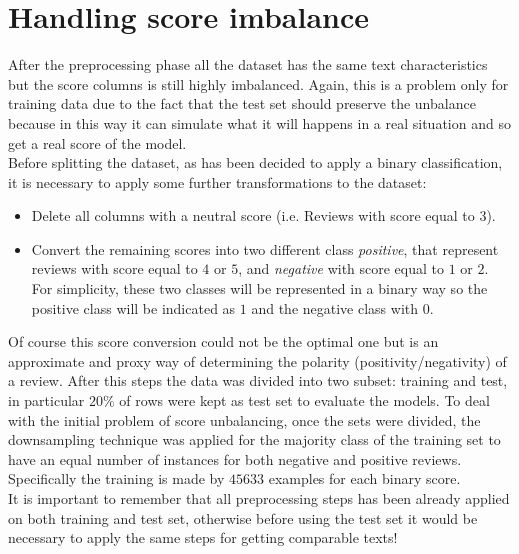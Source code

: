 \documentclass[11pt]{article}
\begin{document}
\section{Handling score imbalance}
After the preprocessing phase all the dataset has the same text characteristics but the score columns is still highly imbalanced. Again, this is a problem only for training data due to the fact that the test set should preserve the unbalance because in this way it can simulate what it will happens in a real situation and so get a real score of the model. \\
Before splitting the dataset, as has been decided to apply a binary classification, it is necessary to apply some further transformations to the dataset:
\begin{itemize}
    \item Delete all columns with a neutral score (i.e. Reviews with score equal to $3$).
    \item Convert the remaining scores into two different class \textit{positive}, that represent reviews with score equal to $4$ or $5$, and \textit{negative} with score equal to $1$ or $2$. For simplicity, these two classes will be represented in a binary way so the positive class will be indicated as  $1$ and the negative class with $0$.
\end{itemize}
Of course this score conversion could not be the optimal one but is an approximate and proxy way of determining the polarity (positivity/negativity) of a review. After this steps the data was divided into two subset: training and test, in particular $20\%$ of rows were kept as test set to evaluate the models. To deal with the initial problem of score unbalancing, once the sets were divided, the downsampling technique was applied for the majority class of the training set to have an equal number of instances for both negative and positive reviews. Specifically the training is made by $45633$ examples for each binary score. \\
It is important to remember that all preprocessing steps has been already applied on both training and test set, otherwise before using the test set it would be necessary to apply the same steps for getting comparable texts!

\newpage
\end{document}
